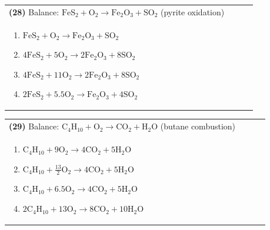 \documentclass{article}
\begin{document}
{\vspace{0.2cm}
\noindent \begin{tabular}{|p{0.9\linewidth}|}
\hline
\vspace{0.2cm}
\textbf{(28)} Balance: \(\mathrm{FeS_2 + O_2 \rightarrow Fe_2O_3 + SO_2}\) (pyrite oxidation)\\
\begin{minipage}[t]{0.85\linewidth}
\begin{enumerate}[label=\alph*.]
   \item \(\mathrm{FeS_2 + O_2 \rightarrow Fe_2O_3 + SO_2}\)
   \item \(\mathrm{4FeS_2 + 5O_2 \rightarrow 2Fe_2O_3 + 8SO_2}\)
   \item \(\mathrm{4FeS_2 + 11O_2 \rightarrow 2Fe_2O_3 + 8SO_2}\)
   \item \(\mathrm{2FeS_2 + 5.5O_2 \rightarrow Fe_2O_3 + 4SO_2}\)
\end{enumerate}
\end{minipage}\\
\hline
\end{tabular}
\newpage

\vspace{0.2cm}
\noindent \begin{tabular}{|p{0.9\linewidth}|}
\hline
\vspace{0.2cm}
\textbf{(29)} Balance: \(\mathrm{C_4H_{10} + O_2 \rightarrow CO_2 + H_2O}\) (butane combustion)\\
\begin{minipage}[t]{0.85\linewidth}
\begin{enumerate}[label=\alph*.]
   \item \(\mathrm{C_4H_{10} + 9O_2 \rightarrow 4CO_2 + 5H_2O}\)
   \item \(\mathrm{C_4H_{10} + \tfrac{13}{2}O_2 \rightarrow 4CO_2 + 5H_2O}\)
   \item \(\mathrm{C_4H_{10} + 6.5O_2 \rightarrow 4CO_2 + 5H_2O}\)
   \item \(\mathrm{2C_4H_{10} + 13O_2 \rightarrow 8CO_2 + 10H_2O}\)
\end{enumerate}
\end{minipage}\\
\hline
\end{tabular}

}
\end{document}
